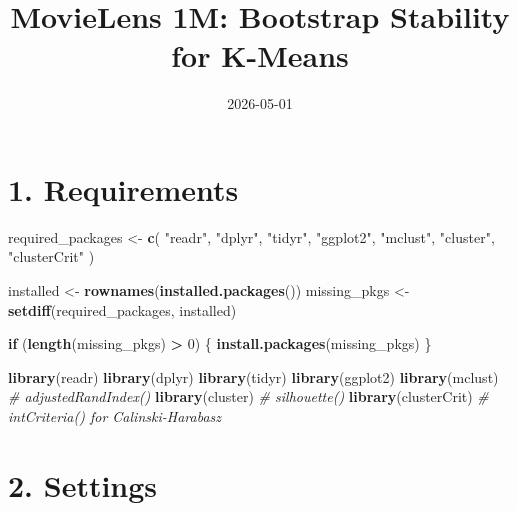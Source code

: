 \documentclass[
  11pt,
]{article}
\title{MovieLens 1M: Bootstrap Stability for K-Means}
\author{}
\date{\vspace{-2.5em}2026-05-01}
\newenvironment{Shaded}{\begin{snugshade}}{\end{snugshade}}
\newcommand{\CommentTok}[1]{\textcolor[rgb]{0.56,0.35,0.01}{\textit{#1}}}
\newcommand{\ControlFlowTok}[1]{\textcolor[rgb]{0.13,0.29,0.53}{\textbf{#1}}}
\newcommand{\DecValTok}[1]{\textcolor[rgb]{0.00,0.00,0.81}{#1}}
\newcommand{\FunctionTok}[1]{\textcolor[rgb]{0.13,0.29,0.53}{\textbf{#1}}}
\newcommand{\NormalTok}[1]{#1}
\newcommand{\OtherTok}[1]{\textcolor[rgb]{0.56,0.35,0.01}{#1}}
\newcommand{\SpecialCharTok}[1]{\textcolor[rgb]{0.81,0.36,0.00}{\textbf{#1}}}
\newcommand{\StringTok}[1]{\textcolor[rgb]{0.31,0.60,0.02}{#1}}
\begin{document}
\maketitle

\section{1. Requirements}\label{requirements}

\begin{Shaded}
\begin{Highlighting}[]
\NormalTok{required\_packages }\OtherTok{\textless{}{-}} \FunctionTok{c}\NormalTok{(}
  \StringTok{"readr"}\NormalTok{, }\StringTok{"dplyr"}\NormalTok{, }\StringTok{"tidyr"}\NormalTok{, }\StringTok{"ggplot2"}\NormalTok{,}
  \StringTok{"mclust"}\NormalTok{, }\StringTok{"cluster"}\NormalTok{, }\StringTok{"clusterCrit"}
\NormalTok{)}

\NormalTok{installed    }\OtherTok{\textless{}{-}} \FunctionTok{rownames}\NormalTok{(}\FunctionTok{installed.packages}\NormalTok{())}
\NormalTok{missing\_pkgs }\OtherTok{\textless{}{-}} \FunctionTok{setdiff}\NormalTok{(required\_packages, installed)}

\ControlFlowTok{if}\NormalTok{ (}\FunctionTok{length}\NormalTok{(missing\_pkgs) }\SpecialCharTok{\textgreater{}} \DecValTok{0}\NormalTok{) \{}
  \FunctionTok{install.packages}\NormalTok{(missing\_pkgs)}
\NormalTok{\}}

\FunctionTok{library}\NormalTok{(readr)}
\FunctionTok{library}\NormalTok{(dplyr)}
\FunctionTok{library}\NormalTok{(tidyr)}
\FunctionTok{library}\NormalTok{(ggplot2)}
\FunctionTok{library}\NormalTok{(mclust)       }\CommentTok{\# adjustedRandIndex()}
\FunctionTok{library}\NormalTok{(cluster)      }\CommentTok{\# silhouette()}
\FunctionTok{library}\NormalTok{(clusterCrit)  }\CommentTok{\# intCriteria() for Calinski{-}Harabasz}
\end{Highlighting}
\end{Shaded}

\section{2. Settings}\label{settings}
\end{document}
